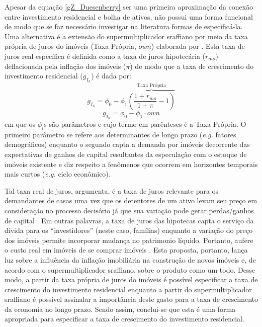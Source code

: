 Apesar da equação \ref{gZ_Duesenberry} ser uma primeira aproximação da conexão entre investimento residencial e bolha de ativos, não possui uma forma funcional de modo que se faz necessário investigar na literatura formas de especificá-la.
Uma alternativa é a extensão do supermultiplicador sraffiano por meio da taxa própria de juros do imóveis (Taxa Própria, $own$) elaborada por \textcite{teixeira_crescimento_2015}. 
Esta taxa de juros real específica é definida como a taxa de juros hipotecária ($r_{mo}$) deflacionada pela inflação dos imóveis ({$\pi$}) de modo que a taxa de crescimento do investimento residencial ($g_{I_h}$) é dada por:
$$
g_{I_h} = \phi_0 - \phi_1 \overbrace{\left(\frac{1+r_{mo}}{1+\pi} - 1\right)}^{\text{Taxa Própria}}
$$
\begin{equation}
\label{tx_Propria}
g_{I_h} = \phi_0 - \phi_1\cdot own
\end{equation}
em que os $\phi_i$s são parâmetros e cujo termo em parênteses é a Taxa Própria. 
O primeiro parâmetro se refere aos determinantes de longo prazo (\textit{e.g.} fatores demográficos) enquanto o segundo capta a demanda por imóveis decorrente das expectativas de ganhos de capital resultantes da especulação com o estoque de imóveis existente e diz respeito a fenômenos que ocorrem em horizontes temporais mais curtos (\textit{e.g.} ciclo econômico). 

Tal taxa real de juros, argumenta, é a taxa de juros relevante para os demandantes de casas uma vez que os detentores de um ativo levam seu preço em consideração no processo decisório já que sua variação pode gerar perdas/ganhos de capital \cite[p.~144]{teixeira_crescimento_2015}.
Em outras palavras, a taxa de juros das hipotecas capta o serviço da dívida para os ``investidores'' (neste caso, famílias) enquanto a variação do preço dos imóveis permite incorporar mudança no patrimonio líquido. Portanto, aufere o custo real em imóveis de se comprar imóveis \cite[p.~53]{teixeira_crescimento_2015}. 
Esta proposta, portanto, lança luz sobre a influência da inflação imobiliária na construção de novos imóveis e, de acordo com o supermultiplicador sraffiano, sobre o produto como um todo. 
Desse modo, a partir da taxa própria de juros do imóveis é possível especificar a taxa de crescimento do investimento residencial enquanto a partir do supermultiplicador sraffiano é possível assinalar a importância deste gasto para a taxa de crescimento da economia no longo prazo.  
Sendo assim, conclui-se que esta é uma forma apropriada para especificar a taxa de crescimento do investimento residencial.

